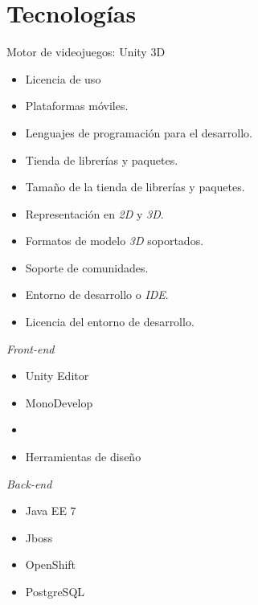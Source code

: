 \section{Tecnologías}
\setcounter{sectiontotal}{3}

\begin{frame}{Motor de videojuegos: Unity 3D}

\begin{itemize}[<+->]
\item Licencia de uso
\item Plataformas móviles.
\item Lenguajes de programación para el desarrollo.
\item Tienda de librerías y paquetes.
\item Tamaño de la tienda de librerías y paquetes.
\item Representación en \textit{2D} y \textit{3D}.
\item Formatos de modelo \textit{3D} soportados.
\item Soporte de comunidades.
\item Entorno de desarrollo o \emph{IDE}.
\item Licencia del entorno de desarrollo.
\end{itemize}

\end{frame}

\begin{frame}{\emph{Front-end}}

\begin{itemize}[<+->]
\item Unity Editor
\item MonoDevelop
\item \cs{}
\item Herramientas de diseño
\end{itemize}

\end{frame}

\begin{frame}{\emph{Back-end}}

\begin{itemize}[<+->]
\item Java EE 7
\item Jboss
\item OpenShift
\item PostgreSQL
\end{itemize}

\end{frame}
